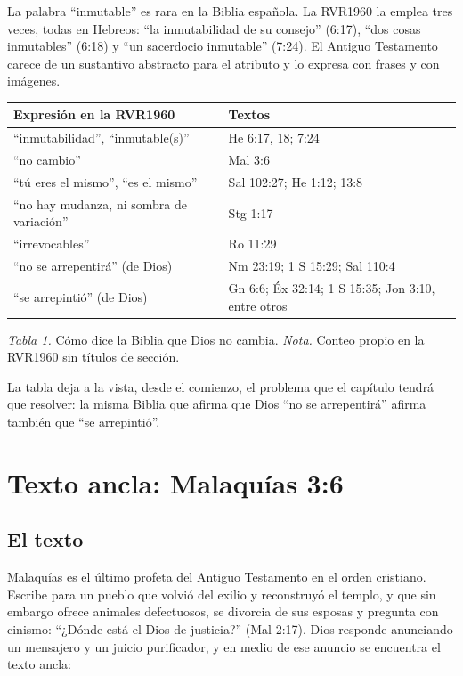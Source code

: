 \documentclass[11pt,letterpaper]{article}
\begin{document}
La palabra ``inmutable'' es rara en la Biblia española. La RVR1960 la emplea tres veces, todas en Hebreos: ``la inmutabilidad de su consejo'' (6:17), ``dos cosas inmutables'' (6:18) y ``un sacerdocio inmutable'' (7:24). El Antiguo Testamento carece de un sustantivo abstracto para el atributo y lo expresa con frases y con imágenes.

\begin{center}\small\renewcommand{\arraystretch}{1.18}
\begin{tabular}{@{}L{5.6cm}L{8.2cm}@{}}
\toprule
\textbf{Expresión en la RVR1960} & \textbf{Textos} \\ \midrule
``inmutabilidad'', ``inmutable(s)'' & He 6:17, 18; 7:24 \\
``no cambio'' & Mal 3:6 \\
``tú eres el mismo'', ``es el mismo'' & Sal 102:27; He 1:12; 13:8 \\
``no hay mudanza, ni sombra de variación'' & Stg 1:17 \\
``irrevocables'' & Ro 11:29 \\
``no se arrepentirá'' (de Dios) & Nm 23:19; 1 S 15:29; Sal 110:4 \\
``se arrepintió'' (de Dios) & Gn 6:6; Éx 32:14; 1 S 15:35; Jon 3:10, entre otros \\
\bottomrule
\end{tabular}\par
{\footnotesize\color{gris}\textit{Tabla 1.} Cómo dice la Biblia que Dios no cambia. \textit{Nota.} Conteo propio en la RVR1960 sin títulos de sección.}
\end{center}

La tabla deja a la vista, desde el comienzo, el problema que el capítulo tendrá que resolver: la misma Biblia que afirma que Dios ``no se arrepentirá'' afirma también que ``se arrepintió''.

\section{Texto ancla: Malaquías 3:6}

\subsection{El texto}
Malaquías es el último profeta del Antiguo Testamento en el orden cristiano. Escribe para un pueblo que volvió del exilio y reconstruyó el templo, y que sin embargo ofrece animales defectuosos, se divorcia de sus esposas y pregunta con cinismo: ``¿Dónde está el Dios de justicia?'' (Mal 2:17). Dios responde anunciando un mensajero y un juicio purificador, y en medio de ese anuncio se encuentra el texto ancla:
\end{document}
